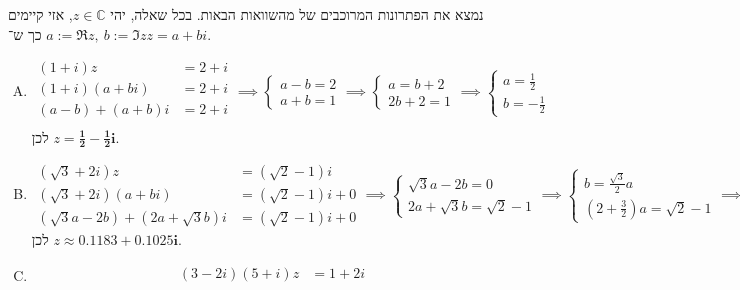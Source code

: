 \documentclass[]{article}
\newcommand\C     {\mathbb{C}}
\theoremstyle{definition}
\newcommand\unquad           {\!\!\!\!}
\begin{document}
	\section{}
	נמצא את הפתרונות המרוכבים של מהשוואות הבאות. בכל שאלה, יהי $z \in \C$, אזי קיימים $a := \Re z, \ b := \Im z$ כך ש־$z = a + bi$. 
	\begin{enumerate}[(A)]
		\item 
		\[ \begin{aligned}
			(1 + i)z &= 2 + i \\
			(1+ i)(a + bi) &= 2 + i \\
			(a - b) + (a + b)i &= 2 + i \\
		\end{aligned} \implies \begin{cases}
			a - b = 2 \\
			a + b = 1
		\end{cases} \unquad\!\!\implies \begin{cases}
			a = b + 2\\
			2b + 2 = 1
		\end{cases} \unquad\!\!\implies \begin{cases}
			a = \frac{1}{2}\\
			b = -\frac{1}{2}
		\end{cases} \]
		לכן $z = \bm{\frac{1}{2} - \frac{1}{2}i}$. 
		\item 
		\[ \begin{aligned}
			(\sqrt 3 + 2i)z &= (\sqrt 2 - 1)i \\
			(\sqrt 3 + 2i)(a + bi) &= (\sqrt 2 - 1)i + 0 \\
			(\sqrt 3 a - 2b) + (2a + \sqrt 3 b)i &= (\sqrt 2 - 1)i + 0
		\end{aligned} \implies \begin{cases}
			\sqrt 3 a - 2b = 0 \\
			2a + \sqrt 3 b = \sqrt 2 - 1
		\end{cases} \unquad\!\!\implies \begin{cases}
			b = \frac{\sqrt 3}{2}a \\
			(2 + \frac{3}{2})a = \sqrt 2 - 1
		\end{cases} \unquad\!\!\implies \begin{cases}
			b \approx 0.1025 \\
			a \approx 0.1183
		\end{cases} \]
		לכן $z \approx \bm{0.1183 + 0.1025i}$. 
		\item 
		\[ \begin{aligned}
			(3 - 2i)(5 + i)z &= 1 + 2i \\

\end{aligned}\]
\end{enumerate}
\end{document}
